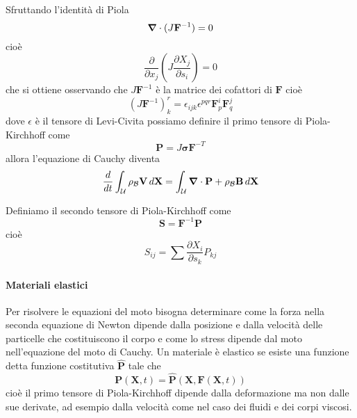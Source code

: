 Sfruttando l'identità di Piola
\begin{equation*}
\boldsymbol{\nabla} \cdot (J\mathbf{F}^{-1}) = 0
\end{equation*}
cioè
\begin{equation*}
\frac{\partial}{\partial x_j}(J\frac{\partial X_j}{\partial s_i}) = 0
\end{equation*}
che si ottiene osservando che $J\mathbf{F}^{-1}$ è la matrice dei cofattori di $\mathbf{F}$ cioè
\begin{equation*}
(J\mathbf{F}^{-1})^r_k = \epsilon_{ijk}\epsilon^{pqr}\mathbf{F}^i_p\mathbf{F}^j_q
\end{equation*}
dove $\epsilon$ è il tensore di Levi-Civita possiamo definire il primo tensore di Piola-Kirchhoff come 
\begin{equation*}
\mathbf{P}=J\boldsymbol{\sigma}\mathbf{F}^{-T}
\end{equation*}
allora l'equazione di Cauchy diventa
\begin{equation*}
\frac{d}{dt}\int_{\mathcal{U}}\rho_{\mathcal{B}}\mathbf{V}\, d\mathbf{X} = \int_\mathcal{U}\boldsymbol{\nabla}\cdot\mathbf{P}+\rho_{\mathcal{B}}\mathbf{B}\, d\mathbf{X}
\end{equation*}

Definiamo il secondo tensore di Piola-Kirchhoff come
\begin{equation*}
\mathbf{S}=\mathbf{F}^{-1}\mathbf{P}
\end{equation*}
cioè
\begin{equation*}
S_{ij} = \sum \frac{\partial X_i}{\partial s_k}P_{kj}
\end{equation*}


\paragraph{Materiali elastici}
Per risolvere le equazioni del moto bisogna determinare come la forza nella seconda equazione di Newton dipende dalla posizione e dalla velocità delle particelle che costituiscono il corpo e come lo stress dipende dal moto nell'equazione del moto di Cauchy. 
Un materiale è elastico se esiste una funzione detta funzione costitutiva $\widehat{\mathbf{P}}$ tale che
\begin{equation*}
\mathbf{P}(\mathbf{X},t)=\widehat{\mathbf{P}}(\mathbf{X},\mathbf{F}(\mathbf{X},t))
\end{equation*}
cioè il primo tensore di Piola-Kirchhoff dipende dalla deformazione ma non dalle sue derivate, ad esempio dalla velocità come nel caso dei fluidi e dei corpi viscosi.
